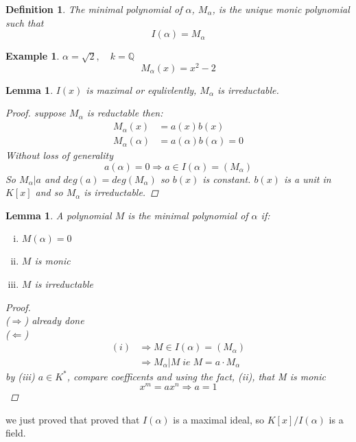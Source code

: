 \documentclass[12pt]{article}
\def\QQ{\mathbb{Q}}
\newtheorem{lemma}[theorem]{Lemma}
\newtheorem{definition}{Definition}[section]
\newtheorem{example}{Example}[section]
\begin{document}
\begin{definition}
The minimal polynomial of $\alpha $, $M_{\alpha}$, is the unique monic polynomial such that
\[I(\alpha ) = M_{\alpha }\]
\end{definition}

\begin{example}$\alpha = \sqrt{2},\quad k=\QQ$ 
\[M_{\alpha}(x) = x^2 - 2 \]
\end{example}
\begin{lemma}
$I(x)$ is maximal or equlivlently, $M_{\alpha } $ is irreductable. 
\begin{proof}
suppose $M_{\alpha}$ is reductable then:
\begin{align*}
M_{\alpha}(x) &= a(x)b(x)\\
M_{\alpha}(\alpha ) &= a(\alpha )b(\alpha )= 0
\end{align*}
Without loss of generality
\[a(\alpha ) = 0 \Rightarrow a \in I(\alpha ) = (M_{\alpha })\]
So $M_{\alpha} | a$ and $deg(a) = deg(M_{\alpha})$ so $b(x)$ is constant. $b(x)$ is a unit in $K[x]$ and so $M_{\alpha}$ is irreductable. 
\end{proof}
\end{lemma}

\begin{lemma}
A polynomial $M$ is the minimal polynomial of $\alpha$ if:
\begin{enumerate}[(i)]
\item $M(\alpha ) = 0$
\item $M$ is monic 
\item $M$ is irreductable
\end{enumerate}
\begin{proof} \quad \\
($\Rightarrow$) already done\\
($\Leftarrow $)
\begin{align*}
(i) &\Rightarrow M \in I(\alpha ) = (M_{\alpha})\\
&\Rightarrow M_{\alpha} | M \; ie \; M= a \cdot M_{\alpha}
\end{align*}
by (iii) $a \in K^*$, compare coefficents and using the fact, (ii), that M is monic
\[x^m = ax^n \Rightarrow a = 1 \]
\end{proof}
\end{lemma}

we just proved that proved that $I(\alpha ) $ is a maximal ideal, so $K[x]/I(\alpha)$ is a field.
\end{document}
